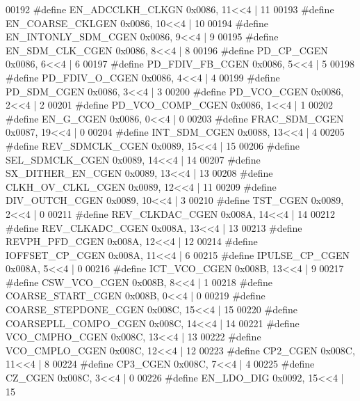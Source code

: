 \begin{DoxyCode}
00192 \textcolor{preprocessor}{#define EN\_ADCCLKH\_CLKGN 0x0086, 11<<4 |  11}
00193 \textcolor{preprocessor}{#define EN\_COARSE\_CKLGEN 0x0086, 10<<4 |  10}
00194 \textcolor{preprocessor}{#define EN\_INTONLY\_SDM\_CGEN 0x0086, 9<<4 |  9}
00195 \textcolor{preprocessor}{#define EN\_SDM\_CLK\_CGEN 0x0086, 8<<4 |  8}
00196 \textcolor{preprocessor}{#define PD\_CP\_CGEN 0x0086, 6<<4 |  6}
00197 \textcolor{preprocessor}{#define PD\_FDIV\_FB\_CGEN 0x0086, 5<<4 |  5}
00198 \textcolor{preprocessor}{#define PD\_FDIV\_O\_CGEN 0x0086, 4<<4 |  4}
00199 \textcolor{preprocessor}{#define PD\_SDM\_CGEN 0x0086, 3<<4 |  3}
00200 \textcolor{preprocessor}{#define PD\_VCO\_CGEN 0x0086, 2<<4 |  2}
00201 \textcolor{preprocessor}{#define PD\_VCO\_COMP\_CGEN 0x0086, 1<<4 |  1}
00202 \textcolor{preprocessor}{#define EN\_G\_CGEN 0x0086, 0<<4 |  0}
00203 \textcolor{preprocessor}{#define FRAC\_SDM\_CGEN 0x0087, 19<<4 |  0}
00204 \textcolor{preprocessor}{#define INT\_SDM\_CGEN 0x0088, 13<<4 |  4}
00205 \textcolor{preprocessor}{#define REV\_SDMCLK\_CGEN 0x0089, 15<<4 |  15}
00206 \textcolor{preprocessor}{#define SEL\_SDMCLK\_CGEN 0x0089, 14<<4 |  14}
00207 \textcolor{preprocessor}{#define SX\_DITHER\_EN\_CGEN 0x0089, 13<<4 |  13}
00208 \textcolor{preprocessor}{#define CLKH\_OV\_CLKL\_CGEN 0x0089, 12<<4 |  11}
00209 \textcolor{preprocessor}{#define DIV\_OUTCH\_CGEN 0x0089, 10<<4 |  3}
00210 \textcolor{preprocessor}{#define TST\_CGEN 0x0089, 2<<4 |  0}
00211 \textcolor{preprocessor}{#define REV\_CLKDAC\_CGEN 0x008A, 14<<4 |  14}
00212 \textcolor{preprocessor}{#define REV\_CLKADC\_CGEN 0x008A, 13<<4 |  13}
00213 \textcolor{preprocessor}{#define REVPH\_PFD\_CGEN 0x008A, 12<<4 |  12}
00214 \textcolor{preprocessor}{#define IOFFSET\_CP\_CGEN 0x008A, 11<<4 |  6}
00215 \textcolor{preprocessor}{#define IPULSE\_CP\_CGEN 0x008A, 5<<4 |  0}
00216 \textcolor{preprocessor}{#define ICT\_VCO\_CGEN 0x008B, 13<<4 |  9}
00217 \textcolor{preprocessor}{#define CSW\_VCO\_CGEN 0x008B, 8<<4 |  1}
00218 \textcolor{preprocessor}{#define COARSE\_START\_CGEN 0x008B, 0<<4 |  0}
00219 \textcolor{preprocessor}{#define COARSE\_STEPDONE\_CGEN 0x008C, 15<<4 |  15}
00220 \textcolor{preprocessor}{#define COARSEPLL\_COMPO\_CGEN 0x008C, 14<<4 |  14}
00221 \textcolor{preprocessor}{#define VCO\_CMPHO\_CGEN 0x008C, 13<<4 |  13}
00222 \textcolor{preprocessor}{#define VCO\_CMPLO\_CGEN 0x008C, 12<<4 |  12}
00223 \textcolor{preprocessor}{#define CP2\_CGEN 0x008C, 11<<4 |  8}
00224 \textcolor{preprocessor}{#define CP3\_CGEN 0x008C, 7<<4 |  4}
00225 \textcolor{preprocessor}{#define CZ\_CGEN 0x008C, 3<<4 |  0}
00226 \textcolor{preprocessor}{#define EN\_LDO\_DIG 0x0092, 15<<4 |  15}

\end{DoxyCode}
